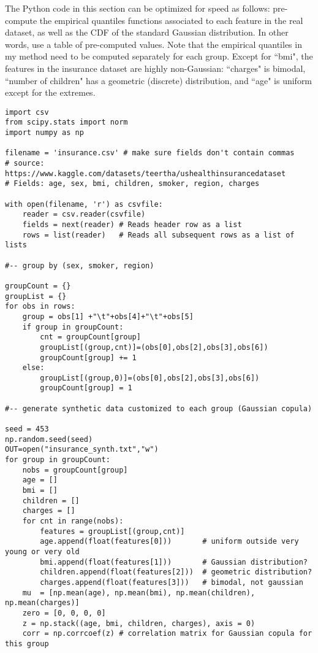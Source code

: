 \documentclass[oneside,10pt]{book}
\begin{document}
The Python code in this section can be optimized for speed as follows: pre-compute the empirical quantiles functions associated to each feature in the real dataset, as well as the CDF of the standard Gaussian distribution. In other words, use a table of pre-computed values. Note that the empirical quantiles in my method need to be computed separately for each group. 
Except for ``bmi", the features in the insurance dataset are highly non-Gaussian: ``charges" is bimodal, ``number of children" has a geometric (discrete) distribution, and ``age" is uniform except for the extremes. \vspace{1ex}


\begin{lstlisting}
import csv 
from scipy.stats import norm
import numpy as np

filename = 'insurance.csv' # make sure fields don't contain commas
# source: https://www.kaggle.com/datasets/teertha/ushealthinsurancedataset
# Fields: age, sex, bmi, children, smoker, region, charges

with open(filename, 'r') as csvfile:
    reader = csv.reader(csvfile)
    fields = next(reader) # Reads header row as a list
    rows = list(reader)   # Reads all subsequent rows as a list of lists

#-- group by (sex, smoker, region)

groupCount = {}
groupList = {}
for obs in rows:
    group = obs[1] +"\t"+obs[4]+"\t"+obs[5]
    if group in groupCount:
        cnt = groupCount[group]
        groupList[(group,cnt)]=(obs[0],obs[2],obs[3],obs[6]) 
        groupCount[group] += 1    
    else:
        groupList[(group,0)]=(obs[0],obs[2],obs[3],obs[6]) 
        groupCount[group] = 1

#-- generate synthetic data customized to each group (Gaussian copula)

seed = 453
np.random.seed(seed)
OUT=open("insurance_synth.txt","w")
for group in groupCount:
    nobs = groupCount[group]
    age = []
    bmi = []
    children = []
    charges = []
    for cnt in range(nobs):
        features = groupList[(group,cnt)]
        age.append(float(features[0]))       # uniform outside very young or very old
        bmi.append(float(features[1]))       # Gaussian distribution?
        children.append(float(features[2]))  # geometric distribution?
        charges.append(float(features[3]))   # bimodal, not gaussian 
    mu  = [np.mean(age), np.mean(bmi), np.mean(children), np.mean(charges)]
    zero = [0, 0, 0, 0] 
    z = np.stack((age, bmi, children, charges), axis = 0)
    corr = np.corrcoef(z) # correlation matrix for Gaussian copula for this group


\end{lstlisting}
\end{document}
